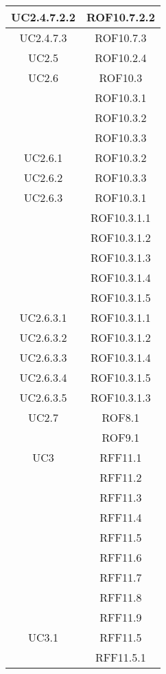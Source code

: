 \begin{longtable}{|c|c|}
\midrule
UC2.4.7.2.2
& ROF10.7.2.2\\

\midrule
UC2.4.7.3
& ROF10.7.3\\

\midrule
UC2.5
& ROF10.2.4\\

\midrule
UC2.6
& ROF10.3\\
& ROF10.3.1\\
& ROF10.3.2\\
& ROF10.3.3\\

\midrule
UC2.6.1
& ROF10.3.2\\

\midrule
UC2.6.2
& ROF10.3.3\\

\midrule
UC2.6.3
& ROF10.3.1\\
& ROF10.3.1.1\\
& ROF10.3.1.2\\
& ROF10.3.1.3\\
& ROF10.3.1.4\\
& ROF10.3.1.5\\

\midrule
UC2.6.3.1
& ROF10.3.1.1\\

\midrule
UC2.6.3.2
& ROF10.3.1.2\\

\midrule
UC2.6.3.3
& ROF10.3.1.4\\

\midrule
UC2.6.3.4
& ROF10.3.1.5\\

\midrule
UC2.6.3.5
& ROF10.3.1.3\\

\midrule
UC2.7
& ROF8.1\\
& ROF9.1\\


\midrule
UC3
& RFF11.1\\
& RFF11.2\\
& RFF11.3\\
& RFF11.4\\
& RFF11.5\\
& RFF11.6\\
& RFF11.7\\
& RFF11.8\\
& RFF11.9\\

\midrule
UC3.1
& RFF11.5\\
& RFF11.5.1\\



\end{longtable}

